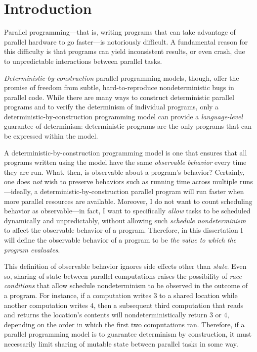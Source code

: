 \chapter{Introduction}\label{ch:intro} %

Parallel programming---that is, writing programs that can take
advantage of parallel hardware to go faster---is notoriously
difficult.  A fundamental reason for this difficulty is that programs
can yield inconsistent results, or even crash, due to unpredictable
interactions between parallel tasks.

\emph{Deterministic-by-construction} parallel programming models,
though, offer the promise of freedom from subtle, hard-to-reproduce
nondeterministic bugs in parallel code.  While there are many ways to
construct deterministic parallel programs and to verify the
determinism of individual programs, only a
deterministic-by-construction programming model can provide a
\emph{language-level} guarantee of determinism: deterministic programs
are the only programs that can be expressed within the model.

A deterministic-by-construction programming model is one that ensures
that all programs written using the model have the same
\emph{observable behavior} every time they are run.  What, then, is
observable about a program's behavior?  Certainly, one does \emph{not}
wish to preserve behaviors such as running time across multiple
runs---ideally, a deterministic-by-construction parallel program will
run faster when more parallel resources are available.  Moreover, I do
not want to count scheduling behavior as observable---in fact, I want
to specifically \emph{allow} tasks to be scheduled dynamically and
unpredictably, without allowing such \emph{schedule nondeterminism} to
affect the observable behavior of a program.  Therefore, in this
dissertation I will define the observable behavior of a program to be
\emph{the value to which the program evaluates}.


This definition of observable behavior ignores side effects other than
\emph{state}.  Even so, sharing of state between parallel computations
raises the possibility of \emph{race conditions} that allow schedule
nondeterminism to be observed in the outcome of a program.  For
instance, if a computation writes $3$ to a shared location while
another computation writes $4$, then a subsequent third computation
that reads and returns the location's contents will
nondeterministically return $3$ or $4$, depending on the order in
which the first two computations ran.  Therefore, if a parallel
programming model is to guarantee determinism by construction, it must
necessarily limit sharing of mutable state between parallel tasks in
some way.

